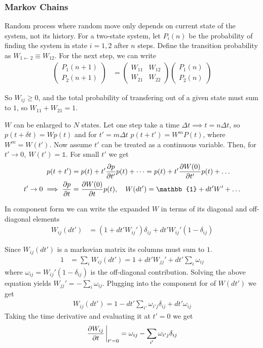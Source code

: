 \documentclass[a4paper, english, 12pt]{article}
\begin{document}
\begin{multicols*}{2}
\subsubsection*{Markov Chains}
Random process where random move only depends on current state of the system, not its history. For a two-state system, let $P_i(n)$ be the probability of finding the system in state $i=1,2$ after $n$ steps. Define the transition probability as $W_{1\gets2}\equiv W_{12}$. For the next step, we can write 
\begin{align*}
    \begin{pmatrix}
        P_1 (n+1) \\
        P_2 (n+1)
    \end{pmatrix}
    &= \begin{pmatrix}
        W_{11} & W_{12} \\ 
        W_{21} & W_{22}
    \end{pmatrix}
    \begin{pmatrix}
        P_1 (n) \\
        P_2 (n)
    \end{pmatrix}
\end{align*}

So $W_{ij}\geq0$, and the total probability of transfering out of a given state must sum to $1$, so $W_{11}+W_{21}=1$. 

$W$ can be enlarged to $N$ states. Let one step take a time $\Delta t\implies t=n\Delta t$, so $p(t+\delta t)=Wp(t)$ and for $t'=m\Delta t$ $p(t+t')=W^m P(t)$, where $W^m=W(t')$. Now assume $t'$ can be treated as a continuous variable. Then, for $t'\to0,\:W(t')=\mathbb{1}$. For small $t'$ we get 
\begin{align*}
    p(t+t') &= p(t) + t' \pdv{p}{t'}p(t) + \dots = p(t) + t' \pdv{W(0)}{t'} p(t) + \dots \\
    t'\to0\implies \pdv{p}{t} &= \pdv{W(0)}{t}p(t),\quad W(dt') = \mathbb{1} + dt' W' + \dots 
\end{align*}

In component form we can write the expanded $W$ in terms of its diagonal and off-diagonal elements 
\begin{align*}
    W_{ij}(dt') &= (1+dt' W_{ij}')\delta_{ij} + dt' W_{ij}' (1 - \delta_{ij})
\end{align*}

Since $W_{ij}(dt')$ is a markovian matrix its columns must sum to $1$.
\begin{align*}
    1 &= \sum_i W_{ij}(dt') = 1 + dt' W_{jj}' + dt' \sum_i \omega_{ij}
\end{align*}
where $\omega_{ij}=W_{ij}'(1-\delta_{ij})$ is the off-diagonal contribution. Solving the above equation yields $W_{jj}'=-\sum_i \omega_{ij}$. Plugging into the component for of $W(dt')$ we get 
\begin{align*}
    W_{ij}(dt') = 1 - dt' \sum_{i'} \omega_{i' j}\delta_{ij} + dt' \omega_{ij}
\end{align*}
Taking the time derivative and evaluating it at $t'=0$ we get 
\begin{align*}
    \pdv{W_{ij}}{t}\eval_{t'=0} = \omega_{ij} - \sum_{i'} \omega_{i' j}\delta_{ij}
\end{align*}


\end{multicols*}
\end{document}
